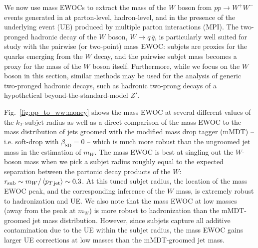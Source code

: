 \begin{table}
{
    }
    \caption[Shifts in the determination of \(m_W\) using mass EWOCs with different energy weightings.]{
        Shifts in the peaks of mass EWOCs with different energy weightings \(n\) due to detector effects or non-perturbative physics, presented in the style of Table \ref{tab:obs_comparison}.
        We observe that the determination of \(m_W\) is less robust to particle-level momentum smearing when using higher energy weights, but that higher energy weights are more robust to non-perturbative QCD effects.
    }
    \label{tab:energyweights}
\end{table}


We now use mass EWOCs to extract the mass of the \(W\) boson from \(pp \to W^+ W^-\) events generated in \pythia{} at parton-level, hadron-level, and in the presence of the underlying event (UE) produced by multiple parton interactions (MPI).
%
The two-pronged hadronic decay of the \(W\) boson, \(W \to q \,\overline{q}\), is particularly well suited for study with the pairwise (or two-point) mass EWOC:
%
subjets are proxies for the quarks emerging from the \(W\) decay, and the pairwise subjet mass becomes a proxy for the mass of the \(W\) boson itself.
%
Furthermore, while we focus on the \(W\) boson in this section, similar methods may be used for the analysis of generic two-pronged hadronic decays, such as hadronic two-prong decays of a hypothetical beyond-the-standard-model $Z'$.

Fig.~\ref{fig:pp_to_ww:money} shows the mass EWOC at several different values of the \(k_T\) subjet radius as well as a direct comparison of the mass EWOC to the mass distribution of jets groomed with the modified mass drop tagger (mMDT) \cite{Dasgupta:2013ihk} -- i.e. \gls{soft-drop} with \(\beta_\text{SD} = 0\) \cite{Larkoski:2014wba} -- which is much more robust than the ungroomed jet mass in the estimation of \(m_W\).
%
The mass EWOC is best at singling out the \(W\)-boson mass when we pick a subjet radius roughly equal to the expected separation between the partonic decay products of the \(W\):
%
\(r_\text{sub} \sim m_W / \left\langle p_{T\,\text{jet}}\right\rangle\sim 0.3\).
%
At this tuned subjet radius, the location of the mass EWOC peak, and the corresponding inference of the \(W\) mass, is extremely robust to hadronization and UE.
%
We also note that the mass EWOC at low masses (away from the peak at \(m_W\)) is more robust to hadronization than the mMDT-groomed jet mass distribution.
%
However, since subjets capture all additive contamination due to the UE within the subjet radius, the mass EWOC gains larger UE corrections at low masses than the mMDT-groomed jet mass.

